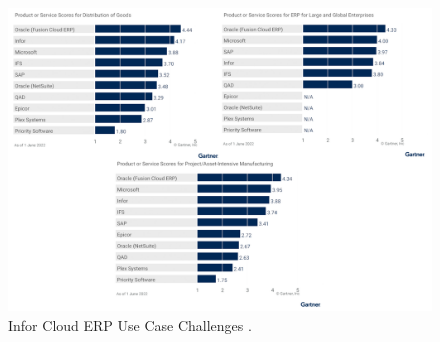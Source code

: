 \documentclass{article}
\begin{document}
\newpage

\begin{figure}[ht!]
    \centering
    \includegraphics[width=\textwidth]{./Infor_Challenges.png}
    \caption{Infor Cloud ERP Use Case Challenges \cite{critical_cloud_erp}.}
    \label{fig:Infor_Challenges}
\end{figure}

\newpage

{}
\end{document}
